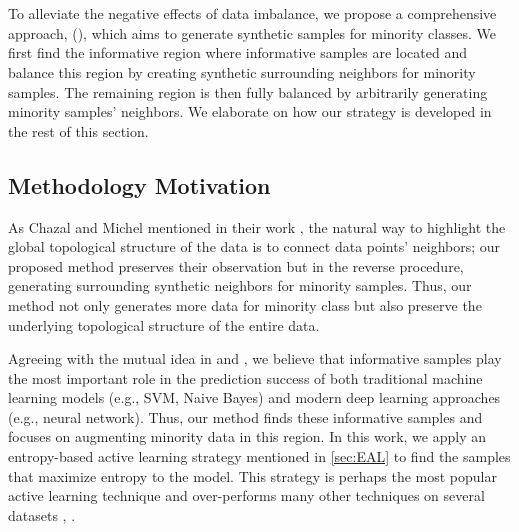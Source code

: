 

\section{\MethodnameLong}
\label{sec:method}
To alleviate the negative effects of data imbalance, we propose a comprehensive approach, \MethodnameLong{} (\Methodname), which aims to generate synthetic samples for minority classes. We first find the informative region where informative samples are located and balance this region by creating synthetic surrounding neighbors for minority samples. The remaining region is then fully balanced by arbitrarily generating minority samples' neighbors. We elaborate on how our strategy is developed in the rest of this section.

\subsection{Methodology Motivation}  

As Chazal and Michel mentioned in their work \cite{leroueil_compressibility_1996}, the natural way to highlight the global topological structure of the data is to connect data points' neighbors; our proposed method preserves their observation but in the reverse procedure, generating surrounding synthetic neighbors for minority samples. Thus, our method not only generates more data for minority class but also preserve the underlying topological structure of the entire data. 

Agreeing with the mutual idea in \cite{ertekin_learning_2007} and \cite{aggarwal_active_2020}, we believe that informative samples play the most important role in the prediction success of both traditional machine learning models (e.g., SVM, Naive Bayes) and modern deep learning approaches (e.g., neural network). Thus, our method finds these informative samples and focuses on augmenting minority data in this region. In this work, we apply an entropy-based active learning strategy mentioned in \ref{sec:EAL} to find the samples that maximize entropy to the model. This strategy is perhaps the most popular active learning technique and over-performs many other techniques on several datasets \cite{DAL}, \cite{7393573} \cite{settles_analysis_2008}.

